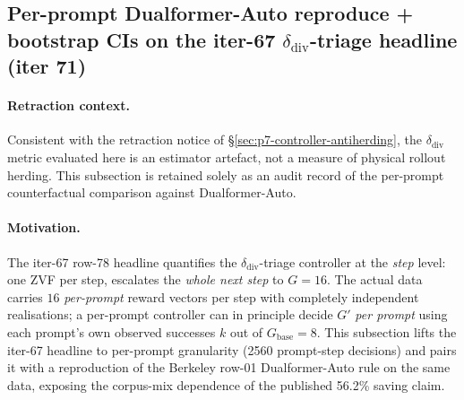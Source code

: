 \subsection{Per-prompt Dualformer-Auto reproduce + bootstrap CIs on
the iter-67 \texorpdfstring{$\delta_{\mathrm{div}}$}{\delta\_div}-triage headline (iter 71)}
\label{sec:p7-per-prompt-dualformer}

\paragraph{Retraction context.}
Consistent with the retraction notice of \S\ref{sec:p7-controller-antiherding},
the $\delta_{\mathrm{div}}$ metric evaluated here is an estimator artefact,
not a measure of physical rollout herding. This subsection is retained
solely as an audit record of the per-prompt counterfactual comparison
against Dualformer-Auto.

\paragraph{Motivation.}
The iter-67 row-78 headline quantifies the $\delta_{\mathrm{div}}$-triage
controller at the \emph{step} level: one ZVF per step, escalates the
\emph{whole next step} to $G{=}16$. The actual data carries $16$
\emph{per-prompt} reward vectors per step with completely independent
realisations; a per-prompt controller can in principle decide $G'$
\emph{per prompt} using each prompt's own observed successes $k$
out of $G_\text{base}{=}8$. This subsection lifts the iter-67 headline
to per-prompt granularity (2560 prompt-step decisions) and pairs it
with a reproduction of the Berkeley row-01 Dualformer-Auto rule on the
same data, exposing the corpus-mix dependence of the published 56.2\%
saving claim.

